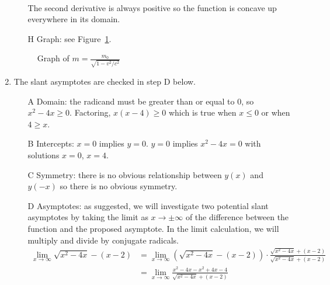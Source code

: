 \documentclass{article}
\newcommand{\ds}{\displaystyle}
\begin{document}
\begin{enumerate}
\begin{itemize}
\begin{align*}
    \end{align*}
    The second derivative is always positive so the function is
    concave up everywhere in its domain.
  \item[H] Graph: see Figure~\ref{fig:relativity}.
  \end{itemize}
  \begin{figure}[htbp]
    \centering
    \caption{Graph of $\ds m=\frac{m_0}{\sqrt{1-v^2/c^2}}$}
    \label{fig:relativity}
  \end{figure}    
\item %
  The slant asymptotes are checked in step D below.
  \begin{itemize}
  \item[A] Domain: the radicand must be greater than or equal to $0$,
    so $x^2-4x\ge 0$.  Factoring, $x(x-4)\ge 0$ which is true when
    $x\le 0$ or when $4\ge x$.
  \item[B] Intercepts: $x=0$ implies $y=0$.  $y=0$ implies $x^2-4x=0$
    with solutions $x=0$, $x=4$.
  \item[C] Symmetry: there is no obvious relationship between $y(x)$
    and $y(-x)$ so there is no obvious symmetry.
  \item[D] Asymptotes: as suggested, we will investigate two potential
    slant asymptotes by taking the limit as $x\to\pm\infty$ of the
    difference between the function and the proposed asymptote.  In
    the limit calculation, we will multiply and divide by conjugate
    radicals.
    \begin{align*}
      \lim_{x\to\infty} \sqrt{x^2-4x}-(x-2)
      &= \lim_{x\to\infty} \left(\sqrt{x^2-4x}-(x-2)\right)
        \cdot\frac{\sqrt{x^2-4x}+(x-2)}{\sqrt{x^2-4x}+(x-2)} \\
      &= \lim_{x\to\infty} \frac{x^2-4x - x^2 + 4x - 4}{\sqrt{x^2-4x}+(x-2)} \\

\end{align*}
\end{itemize}
\end{enumerate}
\end{document}
